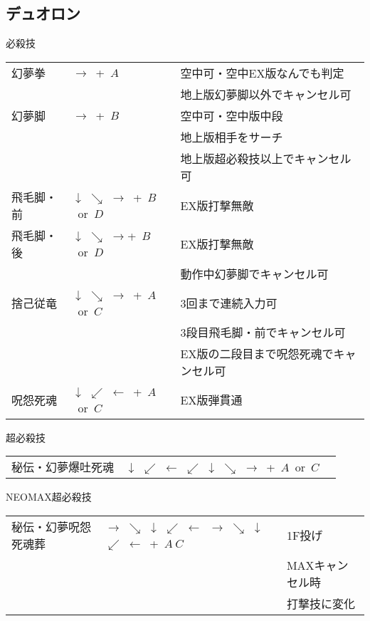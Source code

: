 \documentclass[a4j,11pt]{jarticle}
\def\hado{$\downarrow$ $\searrow$ $\rightarrow$}%
\def\tatsu{$\downarrow$ $\swarrow$ $\leftarrow$}%
\def\gyakuyoga{$\rightarrow$ $\searrow$ $\downarrow$ $\swarrow$ $\leftarrow$}%
\def\orochi{$\downarrow$ $\swarrow$ $\leftarrow$ $\swarrow$ $\downarrow$ $\searrow$ $\rightarrow$}%
\begin{document}
\subsection{デュオロン}
\begin{itembox}[l]{必殺技}
\begin{tabular}{lll}
幻夢拳&$\rightarrow$\ +\ $A$&空中可・空中EX版なんでも判定\\%
&&地上版幻夢脚以外でキャンセル可\\
幻夢脚&$\rightarrow$\ +\ $B$&空中可・空中版中段\\%
&&地上版相手をサーチ\\
&&地上版超必殺技以上でキャンセル可\\
飛毛脚・前&\hado\ +\ $B$\ or\ $D$&EX版打撃無敵\\%
飛毛脚・後&\hado +\ $B$\ or\ $D$&EX版打撃無敵\\%
&&動作中幻夢脚でキャンセル可\\
捨己従竜&\hado\ +\ $A$\ or\ $C$&3回まで連続入力可\\%
&&3段目飛毛脚・前でキャンセル可\\
&&EX版の二段目まで呪怨死魂でキャンセル可\\
呪怨死魂&\tatsu\ +\ $A$\ or\ $C$&EX版弾貫通%
\end{tabular}
\end{itembox}
\begin{itembox}[l]{超必殺技}
\begin{tabular}{lll}
秘伝・幻夢爆吐死魂&\orochi\ +\ $A$\ or\ $C$&%
\end{tabular}
\end{itembox}
\begin{itembox}[l]{NEOMAX超必殺技}
\begin{tabular}{lll}
秘伝・幻夢呪怨死魂葬&\gyakuyoga\ \gyakuyoga\ +\ $A\ C$&1F投げ\\%
&&MAXキャンセル時\\
&&打撃技に変化
\end{tabular}
\end{itembox}
\newpage
\end{document}
